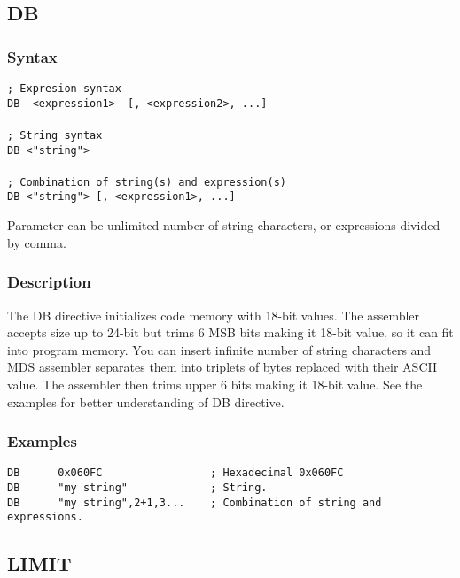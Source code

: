     \subsection{DB}
        \subsubsection{Syntax}
            \verb'; Expresion syntax'\\
            \verb'DB  <expression1>  [, <expression2>, ...]'\\
            \verb''\\
            \verb'; String syntax'\\
            \verb'DB <"string">'\\
            \verb''\\
            \verb'; Combination of string(s) and expression(s)'\\
            \verb'DB <"string"> [, <expression1>, ...]'

            Parameter can be unlimited number of string characters, or expressions divided by comma.

        \subsubsection{Description}
            The DB directive initializes code memory with 18-bit values. The assembler accepts size up to 24-bit but trims 6 MSB bits making it 18-bit value,
            so it can fit into program memory. You can insert infinite number of string characters and MDS assembler separates them into triplets of bytes replaced
            with their ASCII value. The assembler then trims upper 6 bits making it 18-bit value.
            See the examples for better understanding of DB directive.

        \subsubsection{Examples}
            \verb'DB      0x060FC                 ; Hexadecimal 0x060FC'\\
            \verb'DB      "my string"             ; String.'\\
            \verb'DB      "my string",2+1,3...    ; Combination of string and expressions.'\\

    \subsection{LIMIT}
